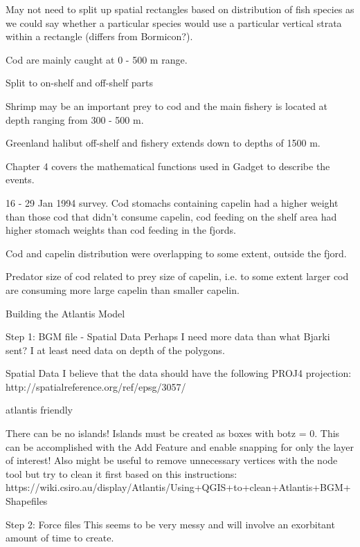 \documentclass{report}
\begin{document}
May not need to split up spatial rectangles based on distribution of fish species as we could say whether a particular species would use a particular vertical strata within a rectangle (differs from Bormicon?).

Cod are mainly caught at 0 - 500 m range.

Split to on-shelf and off-shelf parts

Shrimp may be an important prey to cod and the main fishery is located at depth ranging from 300 - 500 m. 

Greenland halibut off-shelf and fishery extends down to depths of 1500 m. 

Chapter 4 covers the mathematical functions used in Gadget to describe the events.

16 - 29 Jan 1994 survey. Cod stomachs containing capelin had a higher weight than those cod that didn’t consume capelin, cod feeding on the shelf area had higher stomach weights than cod feeding in the fjords. 

Cod and capelin distribution were overlapping to some extent, outside the fjord. 

Predator size of cod related to prey size of capelin, i.e. to some extent larger cod are consuming more large capelin than smaller capelin. 




Building the Atlantis Model

Step 1: BGM file - Spatial Data
Perhaps I need more data than what Bjarki sent? I at least need data on depth of the polygons.

Spatial Data
I believe that the data should have the following PROJ4 projection:
http://spatialreference.org/ref/epsg/3057/

atlantis friendly


There can be no islands! Islands must be created as boxes with botz = 0. This can be accomplished with the Add Feature and enable snapping for only the layer of interest! Also might be useful to remove unnecessary vertices with the node tool but try to clean it first based on this instructions: https://wiki.csiro.au/display/Atlantis/Using+QGIS+to+clean+Atlantis+BGM+Shapefiles

Step 2: Force files
This seems to be very messy and will involve an exorbitant amount of time to create.
\end{document}
